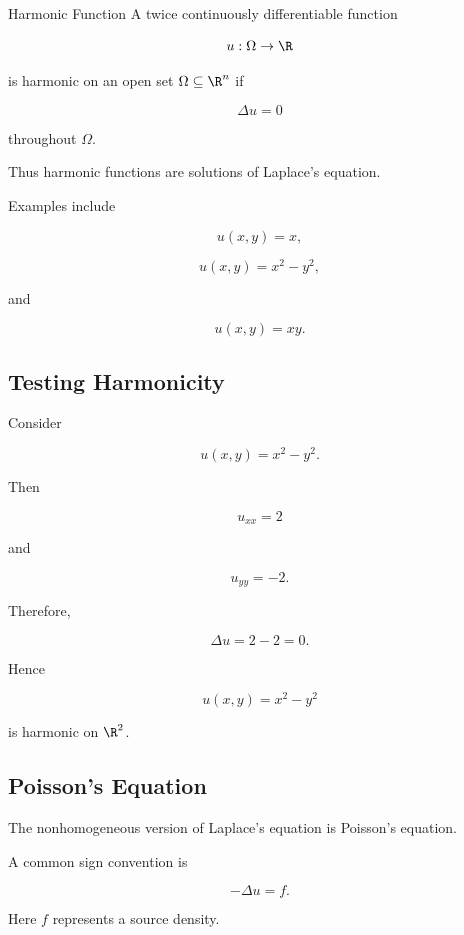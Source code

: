 \begin{definitionbox}{Harmonic Function}
A twice continuously differentiable function

\[
u:\Omega\to\R
\]

is harmonic on an open set \(\Omega\subseteq\R^n\) if

\[
\boxed{
\Delta u=0
}
\]

throughout \(\Omega\).
\end{definitionbox}

Thus harmonic functions are solutions of Laplace's equation.

Examples include

\[
\boxed{
u(x,y)=x,
}
\]

\[
\boxed{
u(x,y)=x^2-y^2,
}
\]

and

\[
\boxed{
u(x,y)=xy.
}
\]

\subsection{Testing Harmonicity}
\label{subsec:testing-harmonicity}

Consider

\[
u(x,y)=x^2-y^2.
\]

Then

\[
u_{xx}=2
\]

and

\[
u_{yy}=-2.
\]

Therefore,

\[
\Delta u
=
2-2
=
0.
\]

Hence

\[
\boxed{
u(x,y)=x^2-y^2
}
\]

is harmonic on \(\R^2\).

\subsection{Poisson's Equation}
\label{subsec:potential-poisson-equation}

The nonhomogeneous version of Laplace's equation is Poisson's equation.

A common sign convention is

\[
\boxed{
-\Delta u=f.
}
\]

Here \(f\) represents a source density.

